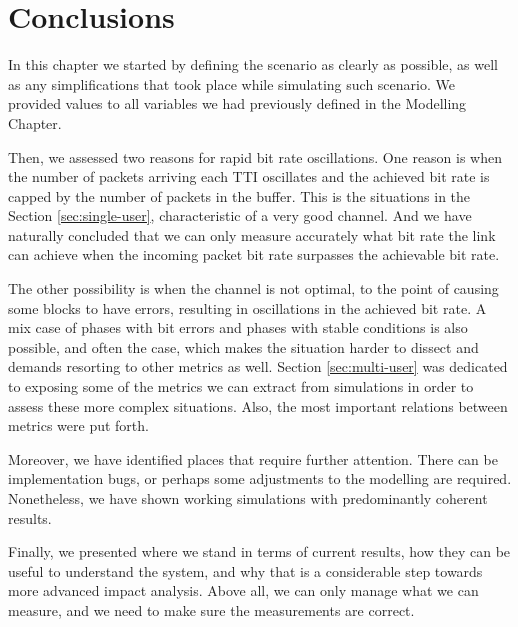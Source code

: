 \section{Conclusions}

In this chapter we started by defining the scenario as clearly as possible, as well as any simplifications that took place while simulating such scenario. We provided values to all variables we had previously defined in the Modelling Chapter.

Then, we assessed two reasons for rapid bit rate oscillations. One reason is when the number of packets arriving each TTI oscillates and the achieved bit rate is capped by the number of packets in the buffer. This is the situations in the Section \ref{sec:single-user}, characteristic of a very good channel. And we have naturally concluded that we can only measure accurately what bit rate the link can achieve when the incoming packet bit rate surpasses the achievable bit rate.

The other possibility is when the channel is not optimal, to the point of causing some blocks to have errors, resulting in oscillations in the achieved bit rate. A mix case of phases with bit errors and phases with stable conditions is also possible, and often the case, which makes the situation harder to dissect and demands resorting to other metrics as well. Section \ref{sec:multi-user} was dedicated to exposing some of the metrics we can extract from simulations in order to assess these more complex situations. Also, the most important relations between metrics were put forth.

Moreover, we have identified places that require further attention. There can be implementation bugs, or perhaps some adjustments to the modelling are required. Nonetheless, we have shown working simulations with predominantly coherent results. 

Finally, we presented where we stand in terms of current results, how they can be useful to understand the system, and why that is a considerable step towards more advanced impact analysis. Above all, we can only manage what we can measure, and we need to make sure the measurements are correct.


